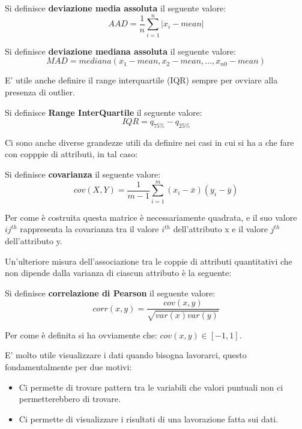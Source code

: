 \begin{defn}
	Si definisce \textbf{deviazione media assoluta} il seguente valore:
	\[ AAD =  \frac{1}{n}\sum_{i=1}^{n}|x_i- mean|\]
\end{defn}

\begin{defn}
	Si definisce \textbf{deviazione mediana assoluta} il seguente valore:
	\[ MAD = mediana(x_{1}-mean, x_{2}-mean, ..., x_{n0}-mean )\]
\end{defn}

E' utile anche definire il range interquartile (IQR) sempre per ovviare alla presenza di outlier.

\begin{defn}
	Si definisce \textbf{Range InterQuartile} il seguente valore:
	\[ IQR = q_{75\%} - q_{25\%}\]
\end{defn}

Ci sono anche diverse grandezze utili da definire nei casi in cui si ha a che fare con copppie di attributi, in tal caso:

\begin{defn}
	Si definisce \textbf{covarianza} il seguente valore:
\[cov(X,Y) = \frac{1}{m -1}\sum_{i = 1}^{m} (x_{i} - \bar{x})(y_{i} - \bar{y})\]
\end{defn}

Per come è costruita questa matrice è necessariamente quadrata, e il suo valore $ij ^{th}$ rappresenta la covarianza tra il valore $i^{th}$ dell'attributo x e il valore $j^{th}$ dell'attributo y.

Un'ulteriore misura dell'associazione tra le coppie di attributi quantitativi che non dipende dalla varianza di ciascun attributo è la seguente:

\begin{defn}
	Si definisce \textbf{correlazione di Pearson} il seguente valore:
	\[ corr(x,y) = \frac{cov(x,y)}{\sqrt{var(x)var(y)}}\]
\end{defn} 
Per come è definita si ha ovviamente che: $cov(x,y) \in [-1,1]$.

E' molto utile visualizzare i dati quando bisogna lavorarci, questo fondamentalmente per due motivi:
\begin{itemize}
	\item Ci permette di trovare pattern tra le variabili che valori puntuali non ci permetterebbero di trovare.
	\item Ci permette di visualizzare i risultati di una lavorazione fatta sui dati.
\end{itemize}

